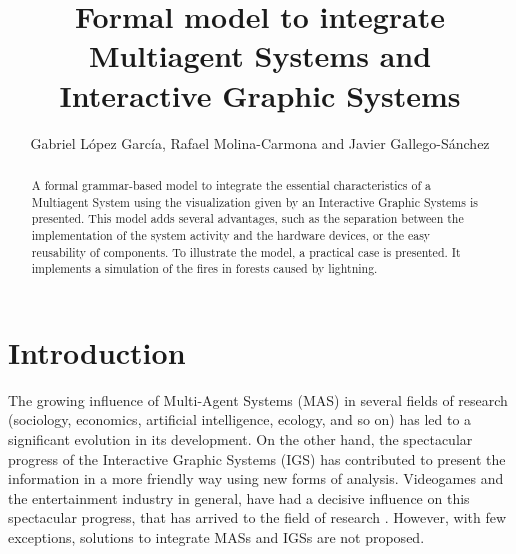 \documentclass[runningheads]{llncs}
\begin{document}
\mainmatter


\title{Formal model to integrate Multiagent Systems and Interactive Graphic Systems}


\author{Gabriel L\'opez Garc\'ia, Rafael Molina-Carmona and Javier Gallego-S\'anchez}




\maketitle


\begin{abstract}

A formal grammar-based model to integrate the essential characteristics of a Multiagent System
using the visualization given by an Interactive Graphic Systems is presented. This model adds
several advantages, such as the separation between the implementation of the system activity and
the hardware devices, or the easy reusability of components. To
illustrate the model, a practical case is presented. It implements a simulation of the fires in
forests caused by lightning.

\end{abstract}



\section{Introduction
\label{sec:introduction}}

The growing influence of Multi-Agent Systems (MAS) in several fields of research (sociology,
economics, artificial intelligence, ecology, and so on) has led to a significant evolution in its
development. On the other hand, the spectacular progress of the Interactive Graphic Systems (IGS)
has contributed to present the information in a more friendly way using new forms of analysis.
Videogames and the entertainment industry in general, have had a decisive influence on this
spectacular progress, that has arrived to the field of research \cite{Rhyne2000}. However, with few
exceptions, solutions to integrate MASs and IGSs are not proposed.
\end{document}
